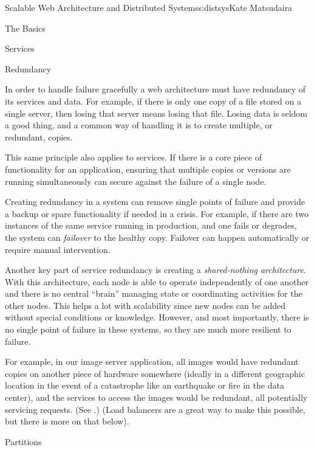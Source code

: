 \begin{aosachapter}{Scalable Web Architecture and Distributed Systems}{s:distsys}{Kate Matsudaira}
\begin{aosasect1}{The Basics}
\begin{aosasect2}{Services}
\end{aosasect2}

\begin{aosasect2}{Redundancy}

In order to handle failure gracefully a web architecture must have
redundancy of its services and data. For example, if there is only one
copy of a file stored on a single server, then losing that server 
means losing that file. Losing data is seldom a good thing, and a
common way of handling it is to create multiple, or redundant, copies.

This same principle also applies to services. If there is a core piece
of functionality for an application, ensuring that multiple copies or
versions are running simultaneously can secure against the failure of
a single node.

Creating redundancy in a system can remove single points of failure
and provide a backup or spare functionality if needed in a crisis. For
example, if there are two instances of the same service running in
production, and one fails or degrades, the system can \emph{failover}
to the healthy copy. Failover can happen
automatically or require manual intervention.

Another key part of service redundancy is creating a \emph{shared-nothing 
architecture}. With this architecture, each node is able to
operate independently of one another and there is no central ``brain''
managing state or coordinating activities for the other nodes. This
helps a lot with scalability since new nodes can be added without
special conditions or knowledge. However, and most importantly, there
is no single point of failure in these systems, so they are much more
resilient to failure.

For example, in our image server application, all images would have
redundant copies on another piece of hardware somewhere (ideally in a
different geographic location in the event of a catastrophe like an
earthquake or fire in the data center), and the services to access the
images would be redundant, all potentially servicing requests. (See 
.)
(Load balancers are a great way to make this possible, but there is
more on that below).


\end{aosasect2}

\begin{aosasect2}{Partitions}


\end{aosasect2}
\end{aosasect1}
\end{aosachapter}
